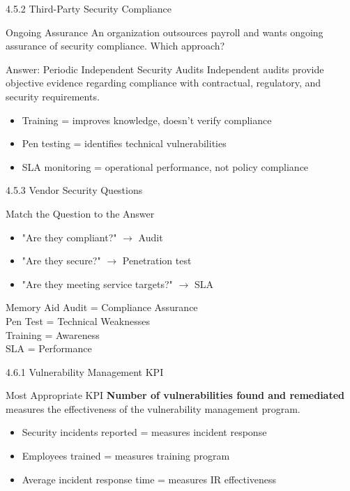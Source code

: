 \documentclass{beamer}
\begin{document}
	\begin{frame}{4.5.2 Third-Party Security Compliance}
		\begin{block}{Ongoing Assurance}
			An organization outsources payroll and wants ongoing assurance of security compliance. Which approach?
		\end{block}
		\begin{exampleblock}{Answer: Periodic Independent Security Audits}
			Independent audits provide objective evidence regarding compliance with contractual, regulatory, and security requirements.
		\end{exampleblock}
		\begin{itemize}
			\item Training = improves knowledge, doesn't verify compliance
			\item Pen testing = identifies technical vulnerabilities
			\item SLA monitoring = operational performance, not policy compliance
		\end{itemize}
	\end{frame}
	
	\begin{frame}{4.5.3 Vendor Security Questions}
		\begin{block}{Match the Question to the Answer}
			\begin{itemize}
				\item "Are they compliant?" $\rightarrow$ Audit
				\item "Are they secure?" $\rightarrow$ Penetration test
				\item "Are they meeting service targets?" $\rightarrow$ SLA
			\end{itemize}
		\end{block}
		\begin{alertblock}{Memory Aid}
			Audit = Compliance Assurance \\
			Pen Test = Technical Weaknesses \\
			Training = Awareness \\
			SLA = Performance
		\end{alertblock}
	\end{frame}
	
	\begin{frame}{4.6.1 Vulnerability Management KPI}
		\begin{block}{Most Appropriate KPI}
			\textbf{Number of vulnerabilities found and remediated} measures the effectiveness of the vulnerability management program.
		\end{block}
		\begin{itemize}
			\item Security incidents reported = measures incident response
			\item Employees trained = measures training program
			\item Average incident response time = measures IR effectiveness
		\end{itemize}
	\end{frame}
	
\end{document}
